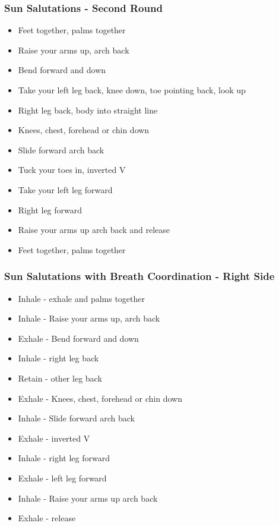 \begin{frame}[fragile]\frametitle{Sun Salutations - Second Round}
\begin{itemize}
    \item Feet together, palms together
    \item Raise your arms up, arch back
    \item Bend forward and down
    \item Take your left leg back, knee down, toe pointing back, look up
    \item Right leg back, body into straight line
    \item Knees, chest, forehead or chin down
    \item Slide forward arch back
    \item Tuck your toes in, inverted V
    \item Take your left leg forward
    \item Right leg forward
    \item Raise your arms up arch back and release
    \item Feet together, palms together
\end{itemize}
\end{frame}

\begin{frame}[fragile]\frametitle{Sun Salutations with Breath Coordination - Right Side}
\begin{itemize}
    \item Inhale - exhale and palms together
    \item Inhale - Raise your arms up, arch back
    \item Exhale - Bend forward and down
    \item Inhale - right leg back
    \item Retain - other leg back
    \item Exhale - Knees, chest, forehead or chin down
    \item Inhale - Slide forward arch back
    \item Exhale - inverted V
    \item Inhale - right leg forward
    \item Exhale - left leg forward
    \item Inhale - Raise your arms up arch back
    \item Exhale - release
\end{itemize}
\end{frame}

